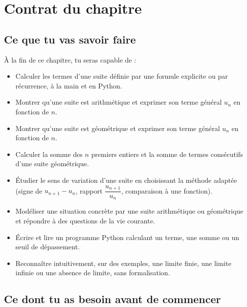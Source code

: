 \section*{Contrat du chapitre}

\subsection*{Ce que tu vas savoir faire}

À la fin de ce chapitre, tu seras capable de :

\begin{itemize}
  \item[\textbf{C1}] Calculer les termes d'une suite définie par une formule explicite ou par récurrence, à la main et en Python.
  \item[\textbf{C2}] Montrer qu'une suite est arithmétique et exprimer son terme général $u_n$ en fonction de $n$.
  \item[\textbf{C3}] Montrer qu'une suite est géométrique et exprimer son terme général $u_n$ en fonction de $n$.
  \item[\textbf{C4}] Calculer la somme des $n$ premiers entiers et la somme de termes consécutifs d'une suite géométrique.
  \item[\textbf{C5}] Étudier le sens de variation d'une suite en choisissant la méthode adaptée (signe de $u_{n+1} - u_n$, rapport $\dfrac{u_{n+1}}{u_n}$, comparaison à une fonction).
  \item[\textbf{C6}] Modéliser une situation concrète par une suite arithmétique ou géométrique et répondre à des questions de la vie courante.
  \item[\textbf{C7}] Écrire et lire un programme Python calculant un terme, une somme ou un seuil de dépassement.
  \item[\textbf{C8}] Reconnaître intuitivement, sur des exemples, une limite finie, une limite infinie ou une absence de limite, sans formalisation.
\end{itemize}

\subsection*{Ce dont tu as besoin avant de commencer}

